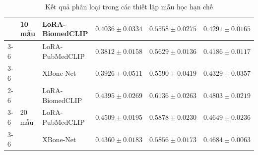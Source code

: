 \begin{table}[H]
{\begin{tabular}{|l|l|l|c|c|c|}
 & \multirow{3}{*}{10 mẫu} & LoRA-BiomedCLIP & $\mathbf{0.4036\pm0.0334}$ & $0.5558\pm0.0275$ & $0.4291\pm0.0165$ \\ \cline{3-6}
 &  & LoRA-PubMedCLIP & $0.3812\pm0.0158$ & $\mathbf{0.5629\pm0.0136}$ & $0.4186\pm0.0117$ \\ \cline{3-6}
 &  & \cellcolor{gray!12}XBone-Net & \cellcolor{gray!12}$0.3926\pm0.0511$ & \cellcolor{gray!12}$0.5590\pm0.0419$ & \cellcolor{gray!12}$\mathbf{0.4329\pm0.0357}$ \\ \cline{2-6}
 & \multirow{3}{*}{20 mẫu} & LoRA-BiomedCLIP & $0.4395\pm0.0269$ & $\mathbf{0.6136\pm0.0263}$ & $\mathbf{0.4803\pm0.0219}$ \\ \cline{3-6}
 &  & LoRA-PubMedCLIP & $\mathbf{0.4509\pm0.0195}$ & $0.5878\pm0.0230$ & $0.4649\pm0.0236$ \\ \cline{3-6}
 &  & \cellcolor{gray!12}XBone-Net & \cellcolor{gray!12}$0.4360\pm0.0183$ & \cellcolor{gray!12}$0.5856\pm0.0173$ & \cellcolor{gray!12}$0.4684\pm0.0063$ \\ \hline
\end{tabular}
}
\caption{Kết quả phân loại trong các thiết lập mẫu học hạn chế}
\label{tab:classification_few_shot}
\end{table}
